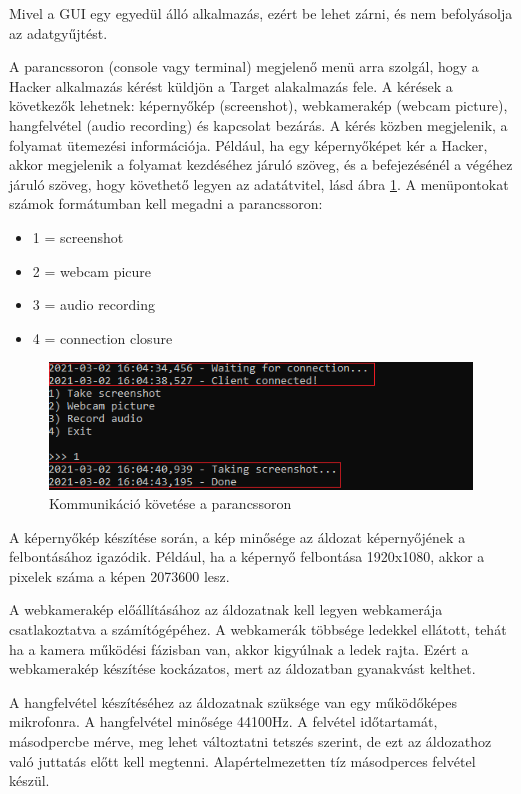 \documentclass[12pt,a4paper,oneside]{report}
\begin{document}
Mivel a GUI egy egyedül álló alkalmazás, ezért be lehet zárni, és nem befolyásolja az adatgyűjtést.

A parancssoron (console vagy terminal) megjelenő menü arra szolgál, hogy a Hacker alkalmazás kérést küldjön a Target alakalmazás fele. A kérések a következők lehetnek: képernyőkép (screenshot), webkamerakép (webcam picture), hangfelvétel (audio recording) és kapcsolat bezárás. A kérés közben megjelenik, a folyamat ütemezési információja. Például, ha egy képernyőképet kér a Hacker, akkor megjelenik a folyamat kezdéséhez járuló szöveg, és a befejezésénél a végéhez járuló szöveg, hogy követhető legyen az adatátvitel, lásd ábra \ref{fig:logging}. A menüpontokat számok formátumban kell megadni a parancssoron:
\begin{itemize}
\item 1 = screenshot
\item 2 = webcam picure
\item 3 = audio recording
\item 4 = connection closure
\end{itemize}
\begin{figure}[H]
\centering
\includegraphics[width=400pt]{../images/tempsnip}
\caption{Kommunikáció követése a parancssoron}
\label{fig:logging}
\end{figure}

A képernyőkép készítése során, a kép minősége az áldozat képernyőjének a felbontásához igazódik. Például, ha a képernyő felbontása 1920x1080, akkor a pixelek száma a képen 2073600 lesz.

A webkamerakép előállításához az áldozatnak kell legyen webkamerája csatlakoztatva a számítógépéhez. A webkamerák többsége ledekkel ellátott, tehát ha a kamera működési fázisban van, akkor kigyúlnak a ledek rajta. Ezért a webkamerakép készítése kockázatos, mert az áldozatban gyanakvást kelthet.

A hangfelvétel készítéséhez az áldozatnak szüksége van egy működőképes mikrofonra. A hangfelvétel minősége 44100Hz. A felvétel időtartamát, másodpercbe mérve, meg lehet változtatni tetszés szerint, de ezt az áldozathoz való juttatás előtt kell megtenni. Alapértelmezetten tíz másodperces felvétel készül.
\end{document}
